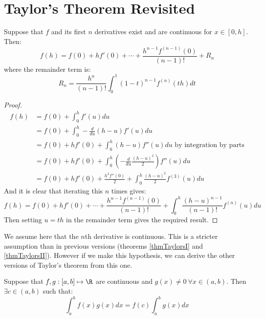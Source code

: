\documentclass[../Main.tex]{subfiles}
\begin{document}
\section{Taylor's Theorem Revisited}
\begin{theorem}
    Suppose that $f$ and its first $n$ derivatives exist and are continuous for $x \in [0, h]$. Then:
    \begin{equation*}
        f(h) = f(0) + hf'(0) + \cdots + \frac{h^{n-1}f^{(n-1)}(0)}{(n-1)!} + R_n
    \end{equation*}
    where the remainder term is:
    \begin{equation*}
        R_n = \frac{h^n}{(n-1)!} \int_0^1 (1-t)^{n-1} f^{(n)}(th) dt
    \end{equation*}
    \label{thmTaylorsIII}
\end{theorem}
\begin{proof}
    \begin{align*}
        f(h) &= f(0) + \int_0^h f'(u) du \\
        &= f(0) + \int_0^h -\frac{d}{du}(h - u)f'(u) du \\
        &= f(0) + hf'(0) + \int_0^h (h - u) f''(u) du \text{ by integration by parts} \\
        &= f(0) + hf'(0) + \int_0^h \left(-\frac{d}{du} \frac{(h - u)^2}{2}\right)f''(u) du \\
        &= f(0) + hf'(0) + \frac{h^2 f''(0)}{2} + \int_0^h \frac{(h - u)^2}{2} f^{(3)}(u) du
    \end{align*}
    And it is clear that iterating this $n$ times gives:
    \begin{equation*}
        f(h) = f(0) + hf'(0) + \cdots + \frac{h^{n-1} f^{(n-1)}(0)}{(n-1)!} + \int_0^h \frac{(h - u)^{n-1}}{(n-1)!}f^{(n)}(u) du
    \end{equation*}
    Then setting $u = th$ in the remainder term gives the required result.
\end{proof}
\begin{remark}
    We assume here that the $n$th derivative is continuous. This is a stricter assumption than in previous versions (theorems \ref{thmTaylorsI} and \ref{thmTaylorsII}). However if we make this hypothesis, we can derive the other versions of Taylor's theorem from this one.
\end{remark}
\begin{theorem}
    Suppose that $f, g : [a, b] \mapsto \R$ are continuous and $g(x) \neq 0~\forall x \in (a, b)$. Then $\exists c \in (a, b)$ such that:
    \begin{equation*}
        \int_a^b f(x) g(x) dx = f(c)\int_a^b g(x) dx 
    \end{equation*}
    \label{thmIntegralMeanValue}
\end{theorem}
\end{document}
